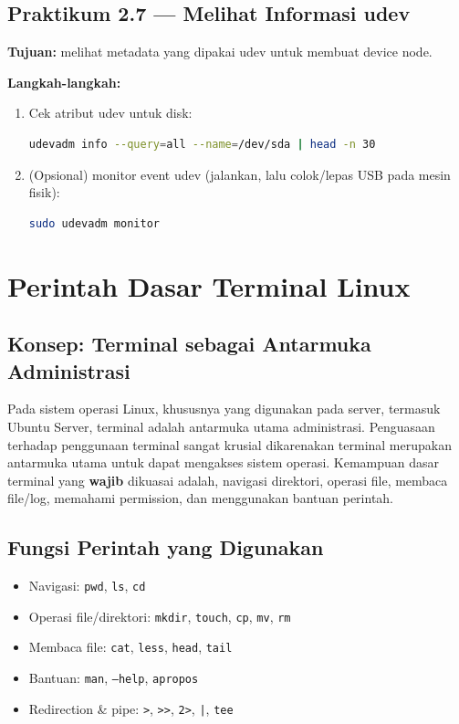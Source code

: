 \subsection*{Praktikum 2.7 --- Melihat Informasi udev}
\textbf{Tujuan:} melihat metadata yang dipakai udev untuk membuat device node.

\textbf{Langkah-langkah:}
\begin{enumerate}
    \item Cek atribut udev untuk disk:
\begin{lstlisting}[language=bash, caption={Melihat atribut udev untuk disk}]
udevadm info --query=all --name=/dev/sda | head -n 30
\end{lstlisting}

    \item (Opsional) monitor event udev (jalankan, lalu colok/lepas USB pada mesin fisik):
\begin{lstlisting}[language=bash, caption={Monitor event udev (opsional)}]
sudo udevadm monitor
\end{lstlisting}
\end{enumerate}

\section{Perintah Dasar Terminal Linux}
\label{sec:basic-commands}

\subsection*{Konsep: Terminal sebagai Antarmuka Administrasi}
Pada sistem operasi Linux, khususnya yang digunakan pada server, termasuk Ubuntu Server, terminal adalah antarmuka utama administrasi. Penguasaan terhadap penggunaan terminal sangat krusial dikarenakan terminal merupakan antarmuka utama untuk dapat mengakses sistem operasi. Kemampuan dasar terminal yang \textbf{wajib} dikuasai adalah,
navigasi direktori, operasi file, membaca file/log, memahami permission, dan menggunakan bantuan perintah.

\subsection*{Fungsi Perintah yang Digunakan}
\begin{itemize}
    \item Navigasi: \texttt{pwd}, \texttt{ls}, \texttt{cd}
    \item Operasi file/direktori: \texttt{mkdir}, \texttt{touch}, \texttt{cp}, \texttt{mv}, \texttt{rm}
    \item Membaca file: \texttt{cat}, \texttt{less}, \texttt{head}, \texttt{tail}
    \item Bantuan: \texttt{man}, \texttt{--help}, \texttt{apropos}
    \item Redirection \& pipe: \texttt{>}, \texttt{>>}, \texttt{2>}, \texttt{|}, \texttt{tee}
\end{itemize}

